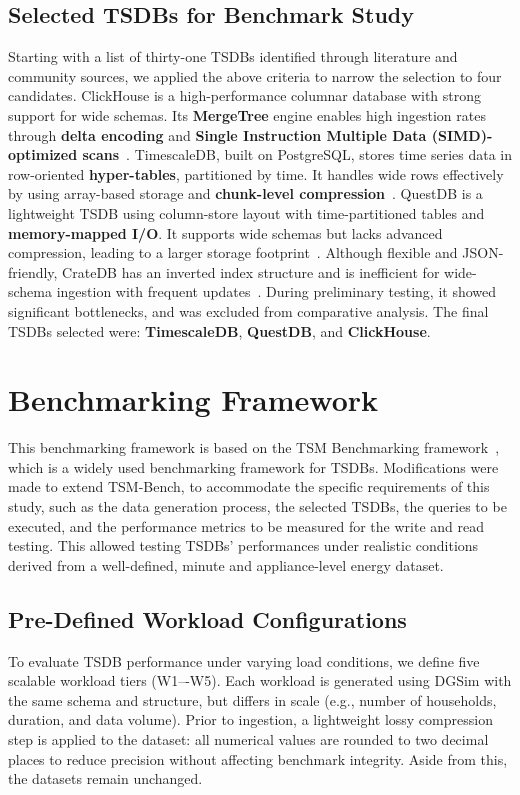 \documentclass[conference]{IEEEtran}
\begin{document}
\subsection{Selected TSDBs for Benchmark Study}
Starting with a list of thirty-one TSDBs identified through literature and community sources, we applied the above criteria to narrow the selection to four candidates.
ClickHouse is a high-performance columnar database with strong support for wide schemas. Its \textbf{MergeTree} engine enables high ingestion rates through \textbf{delta encoding} and \textbf{Single Instruction Multiple Data (SIMD)-optimized scans}~\cite{6_clickbench}.
TimescaleDB, built on PostgreSQL, stores time series data in row-oriented \textbf{hyper-tables}, partitioned by time. It handles wide rows effectively by using array-based storage and \textbf{chunk-level compression}~\cite{2_tsmsurvey2017}.
 QuestDB is a lightweight TSDB using column-store layout with time-partitioned tables and \textbf{memory-mapped I/O}. It supports wide schemas but lacks advanced compression, leading to a larger storage footprint~\cite{13_questdbdocs}.
Although flexible and JSON-friendly, CrateDB has an inverted index structure and is inefficient for wide-schema ingestion with frequent updates~\cite{15_rinaldi2019}. During preliminary testing, it showed significant bottlenecks, and was excluded from comparative analysis.
The final TSDBs selected were: \textbf{TimescaleDB}, \textbf{QuestDB}, and \textbf{ClickHouse}.

\section{Benchmarking Framework}\label{sec:framework}

This benchmarking framework is based on the TSM Benchmarking framework~\cite{1_tsmbench2023}, which is a widely used benchmarking framework for TSDBs.  Modifications were made to extend TSM-Bench, to accommodate the specific requirements of this study, such as the data generation process, the selected TSDBs, the queries to be executed, and the performance metrics to be measured for the write and read testing. This allowed testing TSDBs' performances under realistic conditions derived from a well-defined, minute and appliance-level energy dataset.

\subsection{Pre-Defined Workload Configurations}
To evaluate TSDB performance under varying load conditions, we define five scalable workload tiers (W1–-W5). Each workload is generated using DGSim with the same schema and structure, but differs in scale (e.g., number of households, duration, and data volume). Prior to ingestion, a lightweight lossy compression step is applied to the dataset: all numerical values are rounded to two decimal places to reduce precision without affecting benchmark integrity. Aside from this, the datasets remain unchanged.
\end{document}
